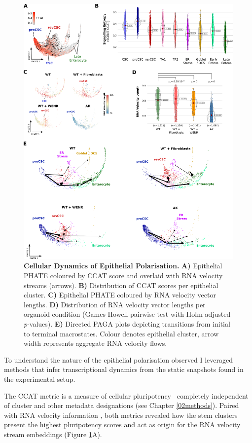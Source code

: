 \begin{figure}
    \centering
    \includegraphics{04seq/figs/4SEQ_Dynamics.png}
    \caption{\textbf{Cellular Dynamics of Epithelial Polarisation.} \textbf{A)} Epithelial PHATE coloured by CCAT score and overlaid with RNA velocity streams (arrows). \textbf{B)} Distribution of CCAT scores per epithelial cluster. \textbf{C)} Epithelial PHATE coloured by RNA velocity vector lengths. \textbf{D)} Distribution of RNA velocity vector lengths per organoid condition (Games-Howell pairwise test with Holm-adjusted \textit{p}-values). \textbf{E)} Directed PAGA plots depicting transitions from initial to terminal macrostates. Colour denotes epithelial cluster, arrow width represents aggregate RNA velocity flows.}
    \label{fig:4dyn}
\end{figure}

To understand the nature of the epithelial polarisation observed I leveraged methods that infer transcriptional dynamics from the static snapshots found in the experimental setup.

The CCAT metric is a measure of cellular pluripotency~\cite{teschendorff_single-cell_2017} completely independent of cluster and other metadata designations (see Chapter \ref{02methods}). Paired with RNA velocity information \cite{bergen_generalizing_2020}, both metrics revealed how the stem clusters present the highest pluripotency scores and act as origin for the RNA velocity stream embeddings (Figure \ref{fig:4dyn}A).

